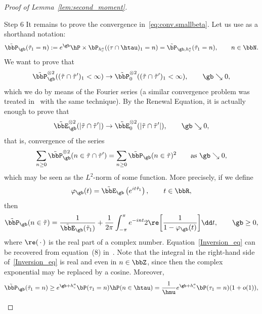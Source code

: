 \begin{proof}[Proof of Lemma~\ref{lem:second_moment}]
\goodbreak
\begin{laststep}{Step 6}
It remains to prove the convergence in~\eqref{eq:conv.smallbeta}. Let us use as a shorthand notation:
\begin{equation}
\tilde \bbP_\gb(\tilde \tau_1 = n) := e^\gb \hP \times \bP_{h_c^a}((\tau \cap \htau)_1 = n) = \tilde \bP_{\gb,h_c^a}(\tilde \tau_1 = n), \qquad n \in \bbN.
\end{equation}
We want to prove that
\begin{equation}
\tilde \bbP_\gb^{\otimes 2}((\tilde \tau \cap \tilde \tau')_1 < \infty) \to \tilde \bbP_0^{\otimes 2}((\tilde \tau \cap \tilde \tau')_1 < \infty), \qquad \gb \searrow 0,
\end{equation}
which we do by means of the Fourier series (a similar convergence problem was treated in~\cite{P13a} with the same technique). By the Renewal Equation, it is actually enough to prove that
\begin{equation}
\tilde \bbE_\gb^{\otimes 2}(|\tilde\tau \cap \tilde\tau'|) \rightarrow \tilde \bbE_0^{\otimes 2}(|\tilde\tau \cap \tilde\tau'|), \qquad \gb \searrow 0,
\end{equation}
that is, convergence of the series
\begin{equation}\label{L2NormSeries}
\sum_{n\geq0} \tilde \bbP_\gb^{\otimes 2}(n \in \tilde\tau \cap \tilde\tau') = \sum_{n\geq0} \tilde \bbP_\gb(n \in \tilde\tau)^2 \qquad \text{as } \gb \searrow 0,
\end{equation}
which may be seen as the $L^2$-norm of some function. More precisely, if we define
\begin{equation}
\varphi_\gb(t) = \tilde \bbE_\gb \left(e^{i t \tilde\tau_1} \right), \qquad t \in \bbR,
\end{equation}
then
\begin{equation}\label{Inversion_eq}
\tilde \bbP_\gb(n \in \tilde\tau) = \frac{1}{\tilde \bbE_\gb(\tilde\tau_1)} + \frac{1}{2 \pi} \int_{- \pi}^\pi e^{- i n t} 2 \re \bigg[\frac{1}{1 - \varphi_\gb(t)} \bigg] \dd t, \qquad \gb \geq 0,
\end{equation}
where $\re(\,\cdot\,)$ is the real part of a complex number. Equation~\eqref{Inversion_eq} can be recovered from equation~(8) in~\cite[Chapter~II.9]{Spitzer}. Note that the integral in the right-hand side of~\eqref{Inversion_eq} is real and even in $n\in\bbZ$, since then the complex exponential may be replaced by a cosine. Moreover,
\begin{equation}
\tilde \bbP_\gb(\tilde\tau_1= n) \geq e^{\gb + h_c^a} \bP(\tau_1 = n) \hP(n \in \htau) = \frac{1}{\hmu} e^{\gb + h_c^a} \bP(\tau_1 = n) (1 + o(1)),

\end{equation}
\end{laststep}
\end{proof}
